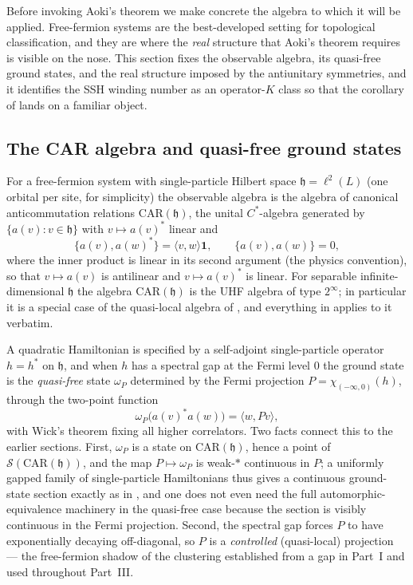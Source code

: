 \documentclass[12pt]{article}
\newcommand{\St}{\mathcal{S}}                   %
\newcommand{\ip}[2]{\langle #1 , #2 \rangle}
\newcommand{\id}{\mathbf{1}}
\theoremstyle{plain}
\begin{document}
Before invoking Aoki's theorem we make concrete the algebra to which it will be
applied. Free-fermion systems are the best-developed setting for topological
classification, and they are where the \emph{real} structure that Aoki's theorem
requires is visible on the nose. This section fixes the observable algebra, its
quasi-free ground states, and the real structure imposed by the antiunitary
symmetries, and it identifies the SSH winding number as an operator-$K$ class so that
the corollary of  lands on a familiar object.

\subsection{The CAR algebra and quasi-free ground states}

For a free-fermion system with single-particle Hilbert space $\mathfrak{h}=\ell^{2}(L)$
(one orbital per site, for simplicity) the observable algebra is the algebra of
canonical anticommutation relations $\mathrm{CAR}(\mathfrak{h})$, the unital
$C^{*}$-algebra generated by $\{a(v):v\in\mathfrak{h}\}$ with $v\mapsto a(v)^{*}$
linear and
\[
  \{a(v),a(w)^{*}\}=\ip{v}{w}\id, \qquad \{a(v),a(w)\}=0 ,
\]
where the inner product is linear in its second argument (the physics convention),
so that $v\mapsto a(v)$ is antilinear and $v\mapsto a(v)^{*}$ is linear.
For separable infinite-dimensional $\mathfrak{h}$ the algebra
$\mathrm{CAR}(\mathfrak{h})$ is the UHF algebra of type $2^{\infty}$; in particular it
is a special case of the quasi-local algebra of , and everything in
 applies to it verbatim.

A quadratic Hamiltonian is specified by a self-adjoint single-particle operator
$h=h^{*}$ on $\mathfrak{h}$, and when $h$ has a spectral gap at the Fermi level $0$ the
ground state is the \emph{quasi-free} state $\omega_{P}$ determined by the Fermi
projection $P=\chi_{(-\infty,0)}(h)$, through the two-point function
\[
  \omega_{P}\bigl(a(v)^{*}a(w)\bigr)=\ip{w}{Pv},
\]
with Wick's theorem fixing all higher correlators. Two facts connect this to the earlier
sections. First, $\omega_{P}$ is a state on $\mathrm{CAR}(\mathfrak{h})$, hence a point
of $\St(\mathrm{CAR}(\mathfrak{h}))$, and the map $P\mapsto\omega_{P}$ is weak-$\ast$
continuous in $P$; a uniformly gapped family of single-particle Hamiltonians thus
gives a continuous ground-state section exactly as in , and one
does not even need the full automorphic-equivalence machinery in the quasi-free case
because the section is visibly continuous in the Fermi projection. Second, the spectral
gap forces $P$ to have exponentially decaying off-diagonal, so $P$ is a
\emph{controlled} (quasi-local) projection --- the free-fermion shadow of the
clustering established from a gap in Part~I and used throughout Part~III.
\end{document}
